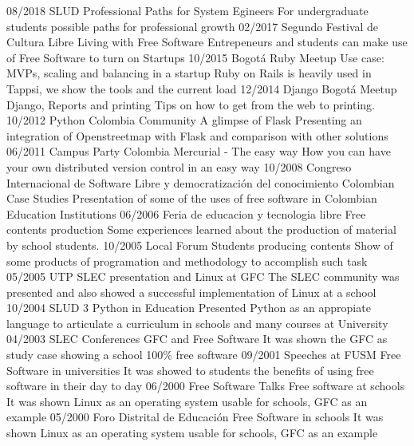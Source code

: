 \begin{entrylist}
  \entry
    {08/2018}
    {SLUD}
    {Professional Paths for System Egineers}
    {For undergraduate students possible paths for professional growth}
  \entry
    {02/2017}
    {Segundo Festival de Cultura Libre}
    {Living with Free Software}
    {Entrepeneurs and students can make use of Free Software to turn on Startups}
  \entry
    {10/2015}
    {Bogotá Ruby Meetup}
    {Use case: MVPs, scaling and balancing in a startup}
    {Ruby on Rails is heavily used in Tappsi, we show the tools and the current load}
  \entry
    {12/2014}
    {Django Bogotá Meetup}
    {Django, Reports and printing}
    {Tips on how to get from the web to printing.}
  \entry
    {10/2012}
    {Python Colombia Community}
    {A glimpse of Flask}
    {Presenting an integration  of Openstreetmap with Flask and
    comparison with other solutions}
  \entry
    {06/2011}
    {Campus Party Colombia}
    {Mercurial - The easy way}
    {How you can have your own distributed version control in an easy way}
  \entry
    {10/2008}
    {Congreso Internacional de Software Libre y
    democratización del conocimiento}
    {Colombian Case Studies}
    {Presentation of some of the uses of free software in Colombian
    Education Institutions}
  \entry
    {06/2006}
    {Feria de educacion y tecnologia libre}
    {Free contents production}
    {Some experiences learned about the production of material
    by school students.}
  \entry
    {10/2005}
    {Local Forum}
    {Students producing contents}
    {Show of
    some products of programation and methodology to accomplish such task}
  \entry
    {05/2005}
    {UTP}
    {SLEC presentation and  Linux at GFC}
    {The SLEC
    community was presented and also showed a successful implementation of
    Linux at a school}
  \entry
    {10/2004}
    {SLUD 3}
    {Python in Education}
    {Presented Python as an
    appropiate language to articulate a curriculum in schools and many
    courses at University}
  \entry
    {04/2003}
    {SLEC Conferences}
    {GFC and Free Software}
    {It was shown the GFC as
    study case showing a school 100\% free software}
  \entry
    {09/2001}
    {Speeches at FUSM}
    {Free Software in
    universities}
    {It was showed to students the benefits of using free
    software in their day to day}
  \entry
    {06/2000}
    {Free Software Talks}
    {Free software at schools}
    {It was shown Linux as an operating system usable for schools, GFC as an example}
  \entry
    {05/2000}
    {Foro Distrital de Educación}
    {Free Software in
    schools}
    {It was shown Linux as an operating system usable for schools, GFC as an example}
\end{entrylist}
